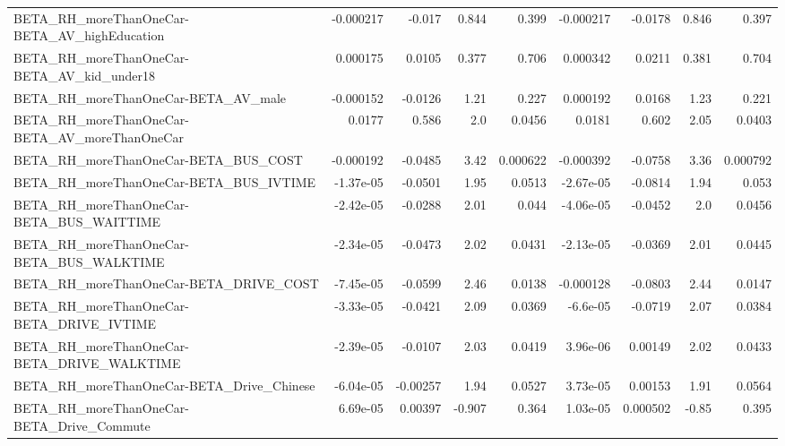 \begin{tabular}{lrrrrrrrr}
BETA\_RH\_moreThanOneCar-BETA\_AV\_highEducation       &   -0.000217 &       -0.017 &    0.844 &    0.399 &  -0.000217 &     -0.0178 &        0.846 &         0.397 \\
BETA\_RH\_moreThanOneCar-BETA\_AV\_kid\_under18         &    0.000175 &       0.0105 &    0.377 &    0.706 &   0.000342 &      0.0211 &        0.381 &         0.704 \\
BETA\_RH\_moreThanOneCar-BETA\_AV\_male                &   -0.000152 &      -0.0126 &     1.21 &    0.227 &   0.000192 &      0.0168 &         1.23 &         0.221 \\
BETA\_RH\_moreThanOneCar-BETA\_AV\_moreThanOneCar      &      0.0177 &        0.586 &      2.0 &   0.0456 &     0.0181 &       0.602 &         2.05 &        0.0403 \\
BETA\_RH\_moreThanOneCar-BETA\_BUS\_COST               &   -0.000192 &      -0.0485 &     3.42 & 0.000622 &  -0.000392 &     -0.0758 &         3.36 &      0.000792 \\
BETA\_RH\_moreThanOneCar-BETA\_BUS\_IVTIME             &   -1.37e-05 &      -0.0501 &     1.95 &   0.0513 &  -2.67e-05 &     -0.0814 &         1.94 &         0.053 \\
BETA\_RH\_moreThanOneCar-BETA\_BUS\_WAITTIME           &   -2.42e-05 &      -0.0288 &     2.01 &    0.044 &  -4.06e-05 &     -0.0452 &          2.0 &        0.0456 \\
BETA\_RH\_moreThanOneCar-BETA\_BUS\_WALKTIME           &   -2.34e-05 &      -0.0473 &     2.02 &   0.0431 &  -2.13e-05 &     -0.0369 &         2.01 &        0.0445 \\
BETA\_RH\_moreThanOneCar-BETA\_DRIVE\_COST             &   -7.45e-05 &      -0.0599 &     2.46 &   0.0138 &  -0.000128 &     -0.0803 &         2.44 &        0.0147 \\
BETA\_RH\_moreThanOneCar-BETA\_DRIVE\_IVTIME           &   -3.33e-05 &      -0.0421 &     2.09 &   0.0369 &   -6.6e-05 &     -0.0719 &         2.07 &        0.0384 \\
BETA\_RH\_moreThanOneCar-BETA\_DRIVE\_WALKTIME         &   -2.39e-05 &      -0.0107 &     2.03 &   0.0419 &   3.96e-06 &     0.00149 &         2.02 &        0.0433 \\
BETA\_RH\_moreThanOneCar-BETA\_Drive\_Chinese          &   -6.04e-05 &     -0.00257 &     1.94 &   0.0527 &   3.73e-05 &     0.00153 &         1.91 &        0.0564 \\
BETA\_RH\_moreThanOneCar-BETA\_Drive\_Commute          &    6.69e-05 &      0.00397 &   -0.907 &    0.364 &   1.03e-05 &    0.000502 &        -0.85 &         0.395 \\

\end{tabular}
